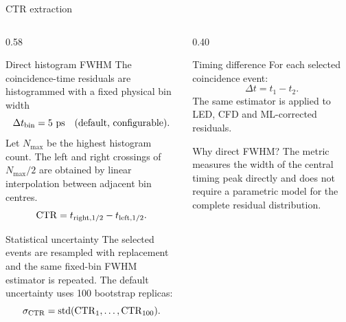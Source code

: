 \begin{frame}{CTR extraction}
\small
\begin{columns}[T,totalwidth=\textwidth]
\begin{column}{0.58\textwidth}
\begin{block}{Direct histogram FWHM}
The coincidence-time residuals are histogrammed with a fixed physical bin width
\[
\Delta t_{\rm bin}=5~\mathrm{ps}\quad\text{(default, configurable).}
\]
Let $N_{\max}$ be the highest histogram count. The left and right crossings of $N_{\max}/2$ are obtained by linear interpolation between adjacent bin centres.
\[
\operatorname{CTR}=t_{\mathrm{right},1/2}-t_{\mathrm{left},1/2}.
\]
\end{block}

\begin{block}{Statistical uncertainty}
The selected events are resampled with replacement and the same fixed-bin FWHM estimator is repeated. The default uncertainty uses 100 bootstrap replicas:
\[
\sigma_{\operatorname{CTR}}=\operatorname{std}(\operatorname{CTR}_1,\ldots,\operatorname{CTR}_{100}).
\]
\end{block}
\end{column}

\begin{column}{0.40\textwidth}
\begin{block}{Timing difference}
For each selected coincidence event:
\[
\Delta t=t_1-t_2.
\]
The same estimator is applied to LED, CFD and ML-corrected residuals.
\end{block}

\begin{block}{Why direct FWHM?}
The metric measures the width of the central timing peak directly and does not require a parametric model for the complete residual distribution.
\end{block}
\end{column}
\end{columns}
\end{frame}
